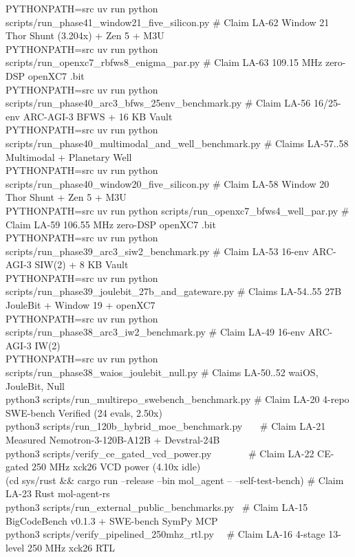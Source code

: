 \documentclass[10pt]{article}
\begin{document}
{{    PYTHONPATH=src uv run python scripts/run\_phase41\_window21\_five\_silicon.py \# Claim LA-62 Window 21 Thor Shunt (3.204x) + Zen 5 + M3U\\
    PYTHONPATH=src uv run python scripts/run\_openxc7\_rbfws8\_enigma\_par.py \# Claim LA-63 109.15 MHz zero-DSP openXC7 .bit\\
    PYTHONPATH=src uv run python scripts/run\_phase40\_arc3\_bfws\_25env\_benchmark.py \# Claim LA-56 16/25-env ARC-AGI-3 BFWS + 16 KB Vault\\
    PYTHONPATH=src uv run python scripts/run\_phase40\_multimodal\_and\_well\_benchmark.py \# Claims LA-57..58 Multimodal + Planetary Well\\
    PYTHONPATH=src uv run python scripts/run\_phase40\_window20\_five\_silicon.py \# Claim LA-58 Window 20 Thor Shunt + Zen 5 + M3U\\
    PYTHONPATH=src uv run python scripts/run\_openxc7\_bfws4\_well\_par.py \# Claim LA-59 106.55 MHz zero-DSP openXC7 .bit\\
    PYTHONPATH=src uv run python scripts/run\_phase39\_arc3\_siw2\_benchmark.py \# Claim LA-53 16-env ARC-AGI-3 SIW(2) + 8 KB Vault\\
    PYTHONPATH=src uv run python scripts/run\_phase39\_joulebit\_27b\_and\_gateware.py \# Claims LA-54..55 27B JouleBit + Window 19 + openXC7\\
    PYTHONPATH=src uv run python scripts/run\_phase38\_arc3\_iw2\_benchmark.py \# Claim LA-49 16-env ARC-AGI-3 IW(2)\\
    PYTHONPATH=src uv run python scripts/run\_phase38\_waios\_joulebit\_null.py \# Claims LA-50..52 waiOS, JouleBit, Null\\
    python3 scripts/run\_multirepo\_swebench\_benchmark.py \# Claim LA-20 4-repo SWE-bench Verified (24 evals, 2.50x)\\
    python3 scripts/run\_120b\_hybrid\_moe\_benchmark.py \ \ \ \# Claim LA-21 Measured Nemotron-3-120B-A12B + Devstral-24B\\
    python3 scripts/verify\_ce\_gated\_vcd\_power.py \ \ \ \ \ \ \ \# Claim LA-22 CE-gated 250 MHz xck26 VCD power (4.10x idle)\\
    (cd sys/rust \&\& cargo run --release --bin mol\_agent -- --self-test-bench) \# Claim LA-23 Rust mol-agent-rs\\
    python3 scripts/run\_external\_public\_benchmarks.py \ \# Claim LA-15 BigCodeBench v0.1.3 + SWE-bench SymPy MCP\\
    python3 scripts/verify\_pipelined\_250mhz\_rtl.py \ \ \# Claim LA-16 4-stage 13-level 250 MHz xck26 RTL\\
}}
\end{document}
